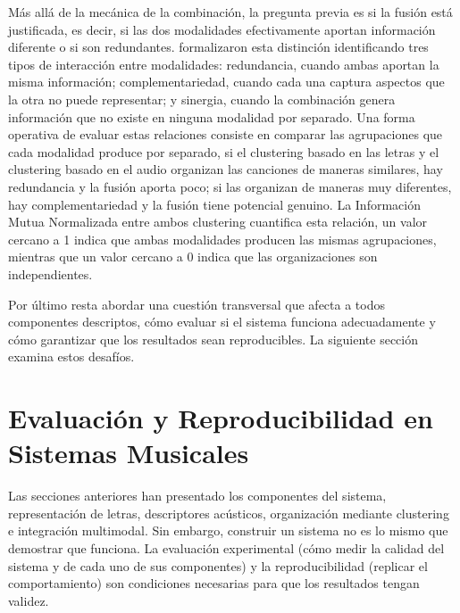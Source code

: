 Más allá de la mecánica de la combinación, la pregunta previa es si la fusión está justificada, es decir, si las dos modalidades efectivamente aportan información diferente o si son redundantes. \textcite{liang_2024_foundations} formalizaron esta distinción identificando tres tipos de interacción entre modalidades: redundancia, cuando ambas aportan la misma información; complementariedad, cuando cada una captura aspectos que la otra no puede representar; y sinergia, cuando la combinación genera información que no existe en ninguna modalidad por separado. Una forma operativa de evaluar estas relaciones consiste en comparar las agrupaciones que cada modalidad produce por separado, si el clustering basado en las letras y el clustering basado en el audio organizan las canciones de maneras similares, hay redundancia y la fusión aporta poco; si las organizan de maneras muy diferentes, hay complementariedad y la fusión tiene potencial genuino. La Información Mutua Normalizada entre ambos clustering cuantifica esta relación, un valor cercano a 1 indica que ambas modalidades producen las mismas agrupaciones, mientras que un valor cercano a 0 indica que las organizaciones son independientes.

Por último resta abordar una cuestión transversal que afecta a todos componentes descriptos, cómo evaluar si el sistema funciona adecuadamente y cómo garantizar que los resultados sean reproducibles. La siguiente sección examina estos desafíos.

\section{Evaluación y Reproducibilidad en Sistemas Musicales}
\label{sec:evaluacion-reproducibilidad}

Las secciones anteriores han presentado los componentes del sistema, representación de letras, descriptores acústicos, organización mediante clustering e integración multimodal. Sin embargo, construir un sistema no es lo mismo que demostrar que funciona. La evaluación experimental (cómo medir la calidad del sistema y de cada uno de sus componentes) y la reproducibilidad (replicar el comportamiento) son condiciones necesarias para que los resultados tengan validez.


